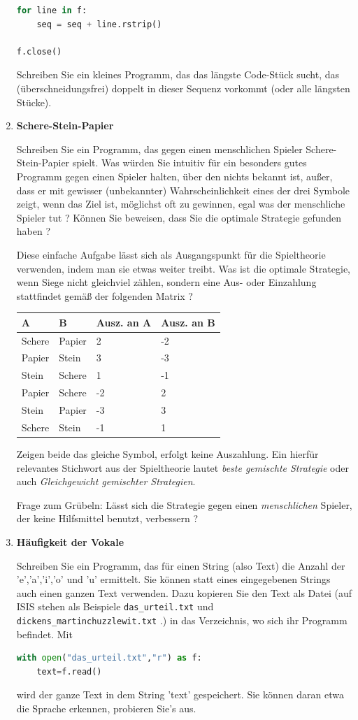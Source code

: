 \begin{enumerate}[1.]
\begin{lstlisting}[language=Python]
for line in f:
	seq = seq + line.rstrip()

f.close()
\end{lstlisting}
Schreiben Sie ein kleines Programm, das das längste Code-Stück sucht,
das (überschneidungsfrei) doppelt in dieser Sequenz vorkommt (oder alle längsten Stücke).


\item \textbf{Schere-Stein-Papier}

Schreiben Sie ein Programm, das gegen einen menschlichen Spieler  Schere-Stein-Papier
spielt.  Was würden Sie intuitiv für ein besonders gutes Programm gegen
einen Spieler halten, über den nichts bekannt ist, außer, dass er mit gewisser (unbekannter) Wahrscheinlichkeit eines
der drei Symbole zeigt, wenn das Ziel ist, möglichst oft zu gewinnen, egal was der
menschliche Spieler tut ? Können Sie beweisen, dass Sie die optimale Strategie gefunden haben ?

{\footnotesize
Diese einfache Aufgabe lässt sich als Ausgangspunkt für die Spieltheorie 
verwenden, indem man sie etwas weiter treibt.
Was ist  die optimale Strategie, wenn Siege nicht gleichviel zählen, sondern
eine Aus- oder Einzahlung stattfindet gemäß der folgenden Matrix ?

\begin{tabular}{ll| l l}
A & B & Ausz. an A & Ausz. an B\\ \hline
Schere & Papier & 2 & -2 \\
Papier & Stein  & 3 & -3 \\
Stein  & Schere & 1 & -1 \\
Papier & Schere & -2 & 2 \\
Stein & Papier & -3 & 3 \\
Schere & Stein & -1 & 1 \\
\end{tabular}

Zeigen beide das gleiche Symbol, erfolgt keine Auszahlung. Ein hierfür relevantes Stichwort aus der Spieltheorie 
lautet {\em beste gemischte Strategie} oder auch {\em Gleichgewicht gemischter Strategien}.

Frage zum Grübeln: Lässt sich die Strategie gegen einen {\em menschlichen} Spieler, der keine
Hilfsmittel benutzt,  verbessern  ?}


\item \textbf{Häufigkeit der Vokale}

Schreiben Sie ein Programm, das für einen String (also Text)
die Anzahl der 'e','a','i','o' und 'u' ermittelt. 
Sie können statt eines eingegebenen Strings auch einen 
ganzen Text verwenden.  Dazu kopieren Sie den Text
als Datei (auf ISIS stehen als Beispiele \texttt{das\_urteil.txt}
und \texttt{dickens\_martinchuzzlewit.txt} .)
in das Verzeichnis, wo sich ihr Programm befindet. Mit
\begin{lstlisting}[language=Python]
with open("das_urteil.txt","r") as f:
    text=f.read()
\end{lstlisting}
wird der ganze Text in dem String 'text' gespeichert.
Sie können daran etwa die Sprache erkennen, probieren Sie's aus.



\end{enumerate}
